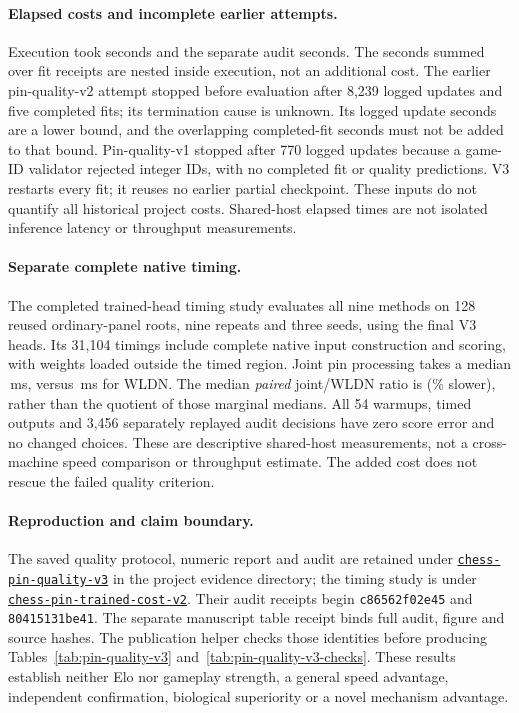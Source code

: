 \paragraph{Elapsed costs and incomplete earlier attempts.}
Execution took \PinQualityExecutionSeconds{} seconds and the separate audit
\PinQualityAuditSeconds{} seconds. The \PinQualityFitSeconds{} seconds summed
over fit receipts are nested inside execution, not an additional cost. The
earlier pin-quality-v2 attempt stopped before evaluation after 8,239 logged
updates and five completed fits; its termination cause is unknown. Its
\PinQualityPriorLoggedSeconds{} logged update seconds are a lower bound, and
the overlapping \PinQualityPriorFitSeconds{} completed-fit seconds must not be
added to that bound. Pin-quality-v1 stopped after 770 logged updates because a
game-ID validator rejected integer IDs, with no completed fit or quality
predictions. V3 restarts every fit; it reuses no earlier partial checkpoint.
These inputs do not quantify all historical project costs. Shared-host elapsed
times are not isolated inference latency or throughput measurements.

\paragraph{Separate complete native timing.}
The completed trained-head timing study evaluates all nine methods on 128
reused ordinary-panel roots, nine repeats and three seeds,
using the final V3 heads. Its 31,104 timings include complete native input
construction and scoring, with weights loaded outside the timed region.
Joint pin processing takes a median \PinCostJointMilliseconds{}\,ms, versus
\PinCostWLDNMilliseconds{}\,ms for WLDN. The median \emph{paired} joint/WLDN
ratio is \PinCostJointRatio{} (\PinCostJointPercent{}\% slower), rather than
the quotient of those marginal medians. All 54 warmups, timed outputs and
3,456 separately replayed audit decisions have zero score error and no changed
choices. These are descriptive shared-host measurements, not a cross-machine
speed comparison or throughput estimate. The added cost does not rescue the
failed quality criterion.

\paragraph{Reproduction and claim boundary.}
The saved quality protocol, numeric report and audit are retained under
\href{https://github.com/kw2828/OpenJev/tree/main/evidence/chess-pin-quality-v3}
{\texttt{chess-pin-quality-v3}} in the project evidence directory; the timing
study is under
\href{https://github.com/kw2828/OpenJev/tree/main/evidence/chess-pin-trained-cost-v2}
{\texttt{chess-pin-trained-cost-v2}}.
Their audit receipts begin \texttt{c86562f02e45} and \texttt{80415131be41}.
The separate manuscript table receipt binds full audit, figure and source
hashes. The publication helper  checks those
identities before producing
Tables~\ref{tab:pin-quality-v3} and~\ref{tab:pin-quality-v3-checks}.
These results establish neither Elo nor gameplay strength, a general speed
advantage, independent confirmation, biological superiority or a novel mechanism
advantage.
\FloatBarrier
